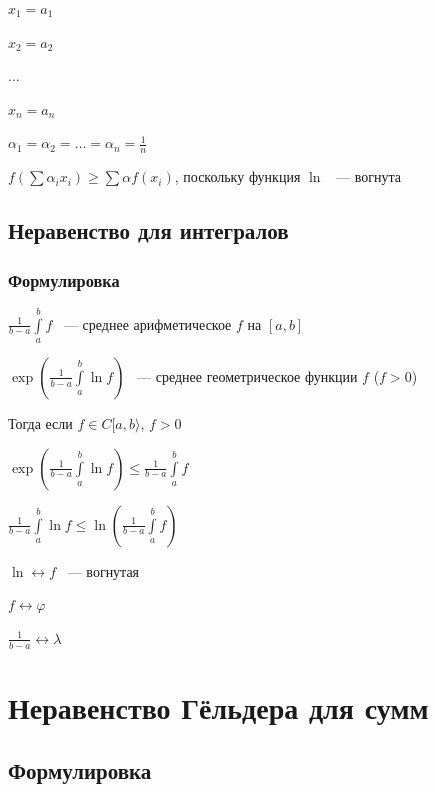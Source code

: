\documentclass{article}
\begin{document}
                $x_1 = a_1$
                
                $x_2 = a_2$
                
                $\ldots$
                
                $x_n = a_n$
                
                $\alpha_1 = \alpha_2 = \ldots = \alpha_n = \frac{1}{n}$
                
                $f(\sum \alpha_i x_i) \geq \sum \alpha f(x_i)$, поскольку функция $\ln$ ~--- вогнута
                
        \subsection{Неравенство для интегралов}
        
            \subsubsection{Формулировка}
                $\frac{1}{b - a} \int\limits^b_a f$ ~--- среднее арифметическое $f$ на $[a, b]$
            
                $\exp\left(\frac{1}{b - a} \int\limits^b_a \ln f \right)$ ~--- среднее геометрическое функции $f$ ($f > 0$)
            
                Тогда если $f \in C[a, b \rangle$, $f > 0$
                
                $\exp\left(\frac{1}{b - a} \int\limits^b_a \ln f \right) \leq \frac{1}{b - a} \int\limits^b_a f$
                
                $\frac{1}{b - a} \int\limits^b_a \ln f \leq \ln \left( \frac{1}{b - a} \int\limits^b_a f \right)$
                
                $\ln \longleftrightarrow f$ ~--- вогнутая
                
                $f \longleftrightarrow \varphi$
                
                $\frac{1}{b - a} \longleftrightarrow \lambda$
                
    \newpage
    
    \section{Неравенство Гёльдера для сумм}
    
        \subsection{Формулировка}
        
\end{document}
